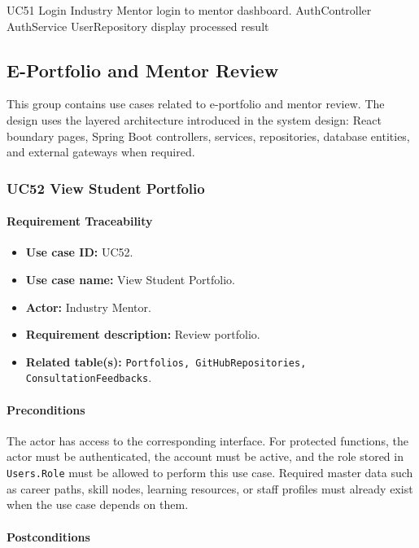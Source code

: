 \SequenceDiagram
{UC51 Login}
{Industry Mentor}
{login to mentor dashboard.}
{AuthController}
{AuthService}
{UserRepository}
{display processed result}

\subsection{E-Portfolio and Mentor Review}

This group contains use cases related to e-portfolio and mentor review. The design uses the layered architecture introduced in the system design: React boundary pages, Spring Boot controllers, services, repositories, database entities, and external gateways when required.

\subsubsection{UC52 View Student Portfolio}

\paragraph{Requirement Traceability}

\begin{itemize}
    \item \textbf{Use case ID:} UC52.
    \item \textbf{Use case name:} View Student Portfolio.
    \item \textbf{Actor:} Industry Mentor.
    \item \textbf{Requirement description:} Review portfolio.
    \item \textbf{Related table(s):} \texttt{Portfolios, GitHubRepositories, ConsultationFeedbacks}.
\end{itemize}

\paragraph{Preconditions}

The actor has access to the corresponding interface. For protected functions, the actor must be authenticated, the account must be active, and the role stored in \texttt{Users.Role} must be allowed to perform this use case. Required master data such as career paths, skill nodes, learning resources, or staff profiles must already exist when the use case depends on them.

\paragraph{Postconditions}

